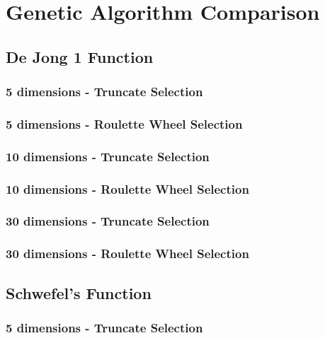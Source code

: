 \documentclass{article}
\begin{document}
\newpage
\section{Genetic Algorithm Comparison}


\subsection{De Jong 1 Function}

\subsubsection{5 dimensions - Truncate Selection}

\subsubsection{5 dimensions - Roulette Wheel Selection}


\subsubsection{10 dimensions - Truncate Selection}

\subsubsection{10 dimensions - Roulette Wheel Selection}


\subsubsection{30 dimensions - Truncate Selection}

\subsubsection{30 dimensions - Roulette Wheel Selection}


\newpage
\subsection{Schwefel’s Function}

\subsubsection{5 dimensions - Truncate Selection}
\end{document}
